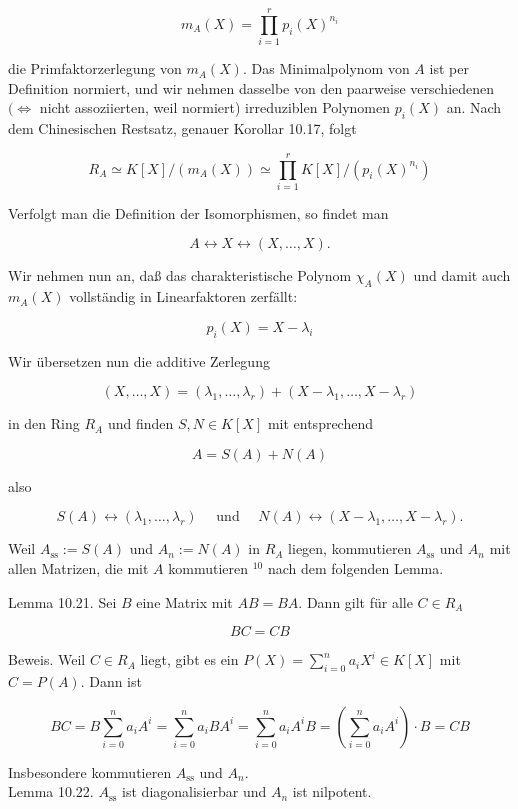 \documentclass[10pt, letterpaper]{article}
\begin{document}
$$
m_{A}(X)=\prod_{i=1}^{r} p_{i}(X)^{n_{i}}
$$

die Primfaktorzerlegung von $m_{A}(X)$. Das Minimalpolynom von $A$ ist per Definition normiert, und wir nehmen dasselbe von den paarweise verschiedenen $(\Longleftrightarrow$ nicht assoziierten, weil normiert) irreduziblen Polynomen $p_{i}(X)$ an. Nach dem Chinesischen Restsatz, genauer Korollar 10.17, folgt

$$
R_{A} \simeq K[X] /\left(m_{A}(X)\right) \simeq \prod_{i=1}^{r} K[X] /\left(p_{i}(X)^{n_{i}}\right)
$$

Verfolgt man die Definition der Isomorphismen, so findet man

$$
A \leftrightarrow X \leftrightarrow(X, \ldots, X) .
$$

Wir nehmen nun an, daß das charakteristische Polynom $\chi_{A}(X)$ und damit auch $m_{A}(X)$ vollständig in Linearfaktoren zerfällt:

$$
p_{i}(X)=X-\lambda_{i}
$$

Wir übersetzen nun die additive Zerlegung

$$
(X, \ldots, X)=\left(\lambda_{1}, \ldots, \lambda_{r}\right)+\left(X-\lambda_{1}, \ldots, X-\lambda_{r}\right)
$$

in den Ring $R_{A}$ und finden $S, N \in K[X]$ mit entsprechend

$$
A=S(A)+N(A)
$$

also

$$
S(A) \leftrightarrow\left(\lambda_{1}, \ldots, \lambda_{r}\right) \quad \text { und } \quad N(A) \leftrightarrow\left(X-\lambda_{1}, \ldots, X-\lambda_{r}\right) .
$$

Weil $A_{\mathrm{ss}}:=S(A)$ und $A_{n}:=N(A)$ in $R_{A}$ liegen, kommutieren $A_{\mathrm{ss}}$ und $A_{n}$ mit allen Matrizen, die mit $A$ kommutieren ${ }^{10}$ nach dem folgenden Lemma.

Lemma 10.21. Sei $B$ eine Matrix mit $A B=B A$. Dann gilt für alle $C \in R_{A}$

$$
B C=C B
$$

Beweis. Weil $C \in R_{A}$ liegt, gibt es ein $P(X)=\sum_{i=0}^{n} a_{i} X^{i} \in K[X]$ mit $C=P(A)$. Dann ist

$$
B C=B \sum_{i=0}^{n} a_{i} A^{i}=\sum_{i=0}^{n} a_{i} B A^{i}=\sum_{i=0}^{n} a_{i} A^{i} B=\left(\sum_{i=0}^{n} a_{i} A^{i}\right) \cdot B=C B
$$

Insbesondere kommutieren $A_{\mathrm{ss}}$ und $A_{n}$.\\
Lemma 10.22. $A_{\mathrm{ss}}$ ist diagonalisierbar und $A_{n}$ ist nilpotent.
\end{document}

